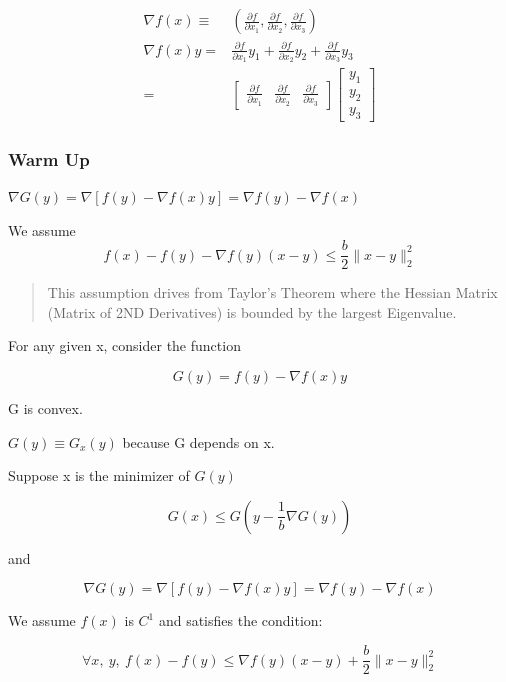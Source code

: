 \documentclass[11pt]{article}
\begin{document}
\begin{equation}
\begin{split}
\nabla f(x) \equiv & (\frac{\partial f}{\partial x_1}, \frac{\partial f}{\partial x_2}, \frac{\partial f}{\partial x_3})\\
\nabla f(x) y = & \frac{\partial f}{\partial x_1} y_1  + \frac{\partial f}{\partial x_2} y_2 + \frac{\partial f}{\partial x_3} y_3\\
= & \begin{bmatrix}
\frac{\partial f}{\partial x_1} & \frac{\partial f}{\partial x_2} & \frac{\partial f}{\partial x_3}
\end{bmatrix} \begin{bmatrix}
y_1\\ y_2\\ y_3
\end{bmatrix}
\end{split}
\end{equation}

\subsubsection{Warm Up}
\label{sec:orgab128bf}

\(\nabla G(y) = \nabla [f(y) - \nabla f(x) y] = \nabla f(y) - \nabla f(x)\)


We assume
$$
f(x) - f(y) - \nabla f(y) (x - y) \leq \frac{b}{2} \|x - y\|_2^2
$$

\begin{quote}
This assumption drives from Taylor's Theorem  where the Hessian Matrix (Matrix
of 2ND Derivatives) is bounded by the largest Eigenvalue.
\end{quote}

For any given x, consider the function

$$
G(y) = f(y) - \nabla f(x) y
$$

G is convex.

\(G(y) \equiv G_x (y)\) because G depends on x.

Suppose x is the minimizer of \(G(y)\)

$$
G(x) \leq G(y - \frac{1}{b} \nabla G(y))
$$

and

$$
\nabla G(y) = \nabla [f(y) - \nabla f(x) y] = \nabla f(y) - \nabla f(x)
$$

We assume \(f(x)\) is \(C^1\) and satisfies the condition:

$$
\forall x, \ y, \ f(x) - f(y) \leq \nabla f(y) (x - y) + \frac{b}{2} \|x - y\|_2^2
$$
\end{document}
